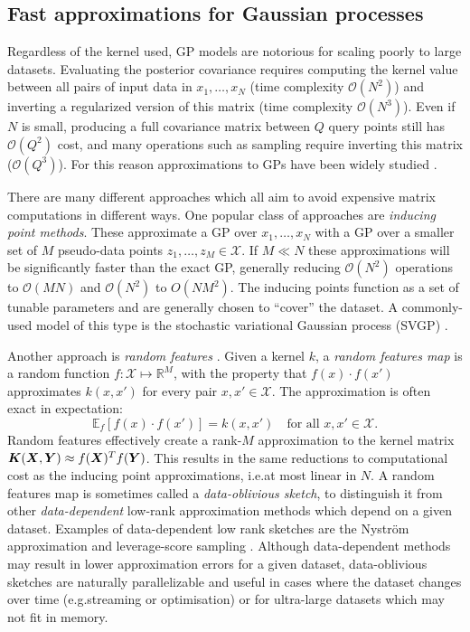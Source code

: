 \subsection{Fast approximations for Gaussian processes}
\label{sec:background:approx-gp-inference}

Regardless of the kernel used, GP models are notorious for scaling poorly to large datasets.
Evaluating the posterior covariance requires computing the kernel value between all
pairs of input data in $x_1,\ldots,x_N$ (time complexity $\mathcal O (N^2)$)
and inverting a regularized version of this matrix (time complexity $\mathcal O (N^3)$).
Even if $N$ is small, producing a full covariance matrix between $Q$
query points still has $\mathcal O(Q^2)$ cost,
and many operations such as sampling require inverting this matrix ($\mathcal O(Q^3)$).
For this reason approximations to GPs have been widely studied
\citep{liu2020scalable-gps}.

There are many different approaches which all aim to avoid expensive matrix computations in different ways.
One popular class of approaches are \emph{inducing point methods}.
These approximate a GP over $x_1,\ldots,x_N$
with a GP over a smaller set of $M$ pseudo-data points $z_1,\ldots,z_M\in\mathcal X$.
If $M\ll N$ these approximations will be significantly faster than the exact GP,
generally reducing $\mathcal O (N^2)$ operations to $\mathcal O(MN)$ and $\mathcal O (N^2)$ to $O(NM^2)$.
The inducing points function as a set of tunable parameters
and are generally chosen to ``cover'' the dataset.
A commonly-used model of this type is the stochastic
variational Gaussian process (SVGP) 
\citep{titsias2009variational,hensman2013gaussian}.

Another approach is \emph{random features} \citep{rahimi2007random}.
Given a kernel $k$, a \emph{random features map} 
is a random function
$f:\mathcal{X}\mapsto\mathbb{R}^M$, with the property that  $f(x)\cdot f(x')$ approximates $k(x,x')$ for every pair $x,x'\in\mathcal X$.
The approximation is often exact in expectation:
\begin{equation}\label{eqn:random-feature-definition}
    \mathbb{E}_f\left[f(x)\cdot f(x')\right]=k(x,x') \quad \text{for all }x,x'\in\mathcal X.
\end{equation}
Random features effectively create a rank-$M$ approximation to the kernel matrix ${\bm{K}}({\bm{X}}, {\bm{Y}}) \approx f({\bm{X}})^T f({\bm{Y}})$.
This results in the same reductions to computational cost as the inducing point approximations,
i.e.\@ at most linear in $N$.
A random features map is sometimes called a \emph{data-oblivious sketch}, to distinguish it from other \emph{data-dependent}
low-rank approximation methods which depend on a given dataset.
Examples of data-dependent low rank sketches are the Nystr\"{o}m approximation and leverage-score sampling \citep{drineas2005nystrom,drineas2012fast}.
Although data-dependent methods may result in lower approximation errors for a given dataset,
data-oblivious sketches are naturally parallelizable and useful in cases where the dataset  changes over time (e.g.\@ streaming or optimisation)
or for ultra-large datasets which may not fit in memory.

